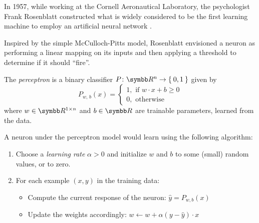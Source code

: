 In 1957, while working at the Cornell Aeronautical Laboratory, the psychologist Frank Rosenblatt constructed what is widely considered to be the first learning machine to employ an artificial neural network \cite{Rosenblatt1957}.



Inspired by the simple McCulloch-Pitts model, Rosenblatt envisioned a neuron as performing a linear mapping on its inputs and then applying a threshold to determine if it should ``fire''.

\begin{definition}
The \emph{perceptron} is a binary classifier \(P \colon \reals^n \to \Set{0, 1}\) given by
\[
    P_{w, \, b} (x) = \begin{cases}
        1, \text{ if } w \cdot x + b \geq 0 \\
        0, \text{ otherwise}
    \end{cases}
\]
where \(w \in \reals^{1 \times n}\) and \(b \in \reals\) are trainable parameters, learned from the data.
\end{definition}

A neuron under the perceptron model would learn using the following algorithm:
\begin{enumerate}
    \item Choose a \emph{learning rate} \(\alpha > 0\) and initialize \(w\) and \(b\) to some (small) random values, or to zero.
    
    \item For each example \(\left(x, y\right)\) in the training data:
    \begin{itemize}
        \item Compute the current response of the neuron: \(\widehat{y} = P_{w, b} (x)\)

        \item Update the weights accordingly: \(w \xleftarrow{} w + \alpha (y - \widehat{y}) \cdot x\)
    \end{itemize}
\end{enumerate}


